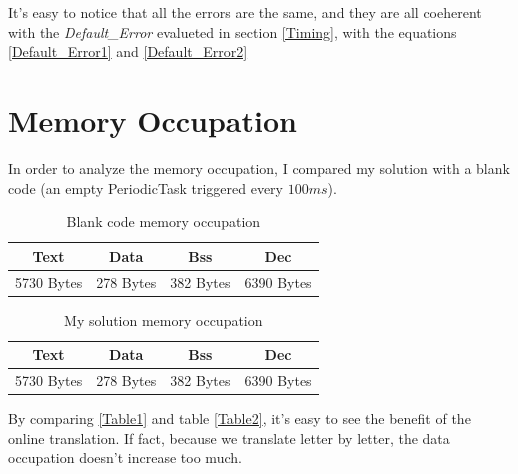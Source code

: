 \documentclass[a4paper]{article}
\begin{document}
It's easy to notice that all the errors are the same, and they are all coeherent with the \emph{Default\_Error} evalueted in section \ref{Timing}, with the equations \ref{Default_Error1} and \ref{Default_Error2}


\section{Memory Occupation}

In order to analyze the memory occupation, I compared my solution with a blank code (an empty PeriodicTask triggered every \(100ms\)).

\begin{table}[h]
  \centering
  \begin{tabular}{|| c || c || c || c ||}
    \hline
    \textbf{Text} & \textbf{Data} & \textbf{Bss} & \textbf{Dec} \\
    \hline
    5730 Bytes    & 278 Bytes     & 382 Bytes    & 6390 Bytes   \\
    \hline
  \end{tabular}
  \caption{Blank code memory occupation}
  \label{Table1}
\end{table}


\begin{table}[h]
  \centering
  \begin{tabular}{|| c || c || c || c ||}
    \hline
    \textbf{Text} & \textbf{Data} & \textbf{Bss} & \textbf{Dec} \\
    \hline
    5730 Bytes    & 278 Bytes     & 382 Bytes    & 6390 Bytes   \\
    \hline
  \end{tabular}
  \caption{My solution memory occupation}
  \label{Table2}
\end{table}

By comparing \autoref{Table1} and table \autoref{Table2}, it's easy to see the benefit of the online translation. If fact, because we translate letter by letter, the data occupation doesn't increase too much.
\end{document}
